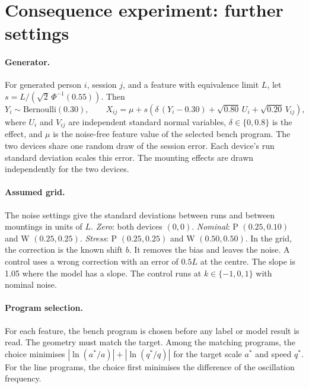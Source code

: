 \documentclass[11pt,a4paper]{article}
\begin{document}
\section{Consequence experiment: further settings}
\label{sec:s-consequence}
\paragraph{Generator.}
For generated person $i$, session $j$, and a feature with equivalence limit $L$, let $s=L/(\sqrt{2}\,\Phi^{-1}(0.55))$.
Then
\begin{equation}
Y_i\sim\mathrm{Bernoulli}(0.30),\qquad
X_{ij}=\mu+s\left(\delta\,(Y_i-0.30)+\sqrt{0.80}\,U_i+\sqrt{0.20}\,V_{ij}\right),
\end{equation}
where $U_i$ and $V_{ij}$ are independent standard normal variables, $\delta\in\{0,0.8\}$ is the effect, and $\mu$ is the noise-free feature value of the selected bench program.
The two devices share one random draw of the session error.
Each device's run standard deviation scales this error.
The mounting effects are drawn independently for the two devices.

\paragraph{Assumed grid.}
The noise settings give the standard deviations between runs and between mountings in units of $L$.
\emph{Zero}: both devices $(0,0)$.
\emph{Nominal}: P $(0.25,0.10)$ and W $(0.25,0.25)$.
\emph{Stress}: P $(0.25,0.25)$ and W $(0.50,0.50)$.
In the grid, the correction is the known shift $b$.
It removes the bias and leaves the noise.
A control uses a wrong correction with an error of $0.5L$ at the centre.
The slope is 1.05 where the model has a slope.
The control runs at $k\in\{-1,0,1\}$ with nominal noise.

\paragraph{Program selection.}
For each feature, the bench program is chosen before any label or model result is read.
The geometry must match the target.
Among the matching programs, the choice minimises $|\ln(a^*/a)|+|\ln(q^*/q)|$ for the target scale $a^*$ and speed $q^*$.
For the line programs, the choice first minimises the difference of the oscillation frequency.
\end{document}
